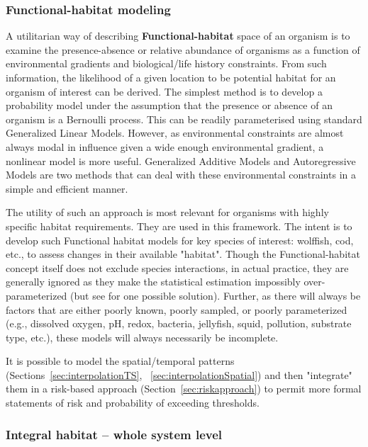 \documentclass[letterpaper,portrait,11pt]{scrartcl}
\numberwithin{equation}{section}		%
\numberwithin{figure}{section}		%
\numberwithin{table}{section}				%
\begin{document}
\subsubsection{Functional-habitat modeling}
\label{sec:habitatSpecies}

A utilitarian way of describing \textbf{Functional-habitat} space of an organism is to examine the presence-absence or relative abundance of organisms as a function of environmental gradients and biological/life history constraints. From such information, the likelihood of a given location to be potential habitat for an organism of interest can be derived. The simplest method is to develop a probability model under the assumption that the presence or absence of an organism is a Bernoulli process. This can be readily parameterised using standard Generalized Linear Models. However, as environmental constraints are almost always modal in influence given a wide enough environmental gradient, a nonlinear model is more useful. Generalized Additive Models and Autoregressive Models are two methods that can deal with these environmental constraints in a simple and efficient manner. 

The utility of such an approach is most relevant for organisms with highly specific habitat requirements. They are used in this framework. The intent is to develop such Functional habitat models for key species of interest: wolffish, cod, etc., to assess changes in their available "habitat". Though the Functional-habitat concept itself does not exclude species interactions, in actual practice, they are generally ignored as they make the statistical estimation impossibly over-parameterized (but see \cite{choi:2012:resdoc} for one possible solution). Further, as there will always be factors that are either poorly known, poorly sampled, or poorly parameterized (e.g., dissolved oxygen, pH, redox, bacteria, jellyfish, squid, pollution, substrate type, etc.), these models will always necessarily be incomplete. 

It is possible to model the spatial/temporal patterns (Sections~\ref{sec:interpolationTS}, ~\ref{sec:interpolationSpatial}) and then "integrate" them in a risk-based approach (Section~\ref{sec:riskapproach}) to permit more formal statements of risk and probability of exceeding thresholds. 


\subsubsection{Integral habitat -- whole system level}
\label{sec:integralHabitat}
\end{document}
